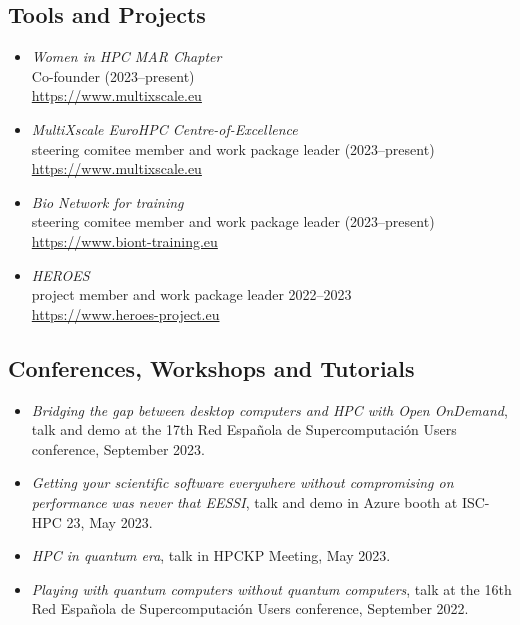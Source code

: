 \subsection*{Tools and Projects}

\begin{itemize}
    \item[] \emph{Women in HPC MAR Chapter}
        \\Co-founder (2023--present)
        \\{\small{\url{https://www.multixscale.eu}}}
    \item[] \emph{MultiXscale EuroHPC Centre-of-Excellence}
        \\steering comitee member and work package leader (2023--present)
        \\{\small{\url{https://www.multixscale.eu}}}
    \item[] \emph{Bio Network for training}
        \\steering comitee member and work package leader (2023--present)
        \\{\small{\url{https://www.biont-training.eu}}}
    \item[] \emph{HEROES}
        \\project member and work package leader {2022--2023}
        \\{\small{\url{https://www.heroes-project.eu}}}

\end{itemize}

\subsection*{Conferences, Workshops and Tutorials}

\begin{itemize}

\item[] \emph{Bridging the gap between desktop computers and HPC with Open OnDemand}, talk and demo at the 17th Red Española de
    Supercomputación Users conference, September 2023.
\item[] \emph{Getting your scientific software everywhere without compromising on performance was never that EESSI}, talk and demo in
    Azure booth at ISC-HPC 23, May 2023.
\item[] \emph{HPC in quantum era}, talk in HPCKP Meeting, May 2023.
\item[] \emph{Playing with quantum computers without quantum computers}, talk at the 16th Red Española de Supercomputación
    Users conference, September 2022.


\end{itemize}

